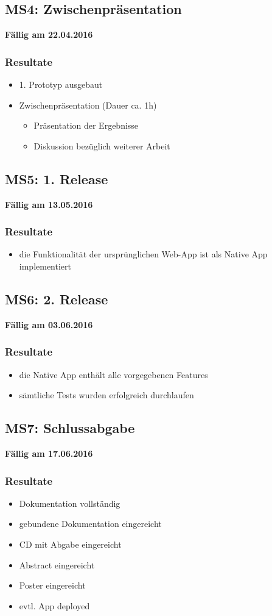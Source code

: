 \subsection{MS4: Zwischenpräsentation}
\label{pm-ms4}
\textbf{Fällig am 22.04.2016}
\subsubsection{Resultate}
\begin{itemize}
	\item 1. Prototyp ausgebaut
	\item Zwischenpräsentation (Dauer ca. 1h)
	\begin{itemize}
		\item Präsentation der Ergebnisse
		\item Diskussion bezüglich weiterer Arbeit
	\end{itemize}
\end{itemize}

\subsection{MS5: 1. Release}
\label{pm-ms5}
\textbf{Fällig am 13.05.2016}
\subsubsection{Resultate}
\begin{itemize}
	\item die Funktionalität der ursprünglichen \kort{} Web-App ist als Native App implementiert
\end{itemize}

\subsection{MS6: 2. Release}
\label{pm-ms6}
\textbf{Fällig am 03.06.2016}
\subsubsection{Resultate}
\begin{itemize}
	\item die Native App enthält alle vorgegebenen Features
	\item sämtliche Tests wurden erfolgreich durchlaufen
\end{itemize}

\subsection{MS7: Schlussabgabe}
\label{pm-ms7}
\textbf{Fällig am 17.06.2016}
\subsubsection{Resultate}
\begin{itemize}
	\item Dokumentation vollständig
	\item gebundene Dokumentation eingereicht
	\item CD mit Abgabe eingereicht
	\item Abstract eingereicht
	\item Poster eingereicht
	\item evtl. App deployed
\end{itemize}